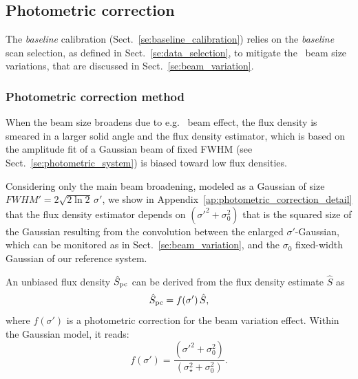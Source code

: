 \subsection{Photometric correction}
\label{se:photometric_correction}

The \emph{baseline} calibration (Sect.~\ref{se:baseline_calibration}) relies on
the \emph{baseline} scan selection, as defined in Sect.~\ref{se:data_selection},
to mitigate the \afternoon\ beam size variations, that are discussed in
Sect.~\ref{se:beam_variation}. 

\subsubsection{Photometric correction method}
\label{se:photometric_correction_method}

When the beam size broadens due to e.g. \afternoon\ beam effect, the
flux density is smeared in a larger solid angle and
the flux density estimator, which is based on the amplitude fit of a
Gaussian beam of fixed FWHM (see
Sect.~\ref{se:photometric_system}) is biased toward low flux
densities.

Considering only the main beam broadening, modeled as a Gaussian of
size $FWHM' = 2 \sqrt{2\ln{2}} \, \sigma '$, we show in
Appendix~\ref{ap:photometric_correction_detail} that
the flux density estimator depends on {\lp $(\sigma'^2 +\sigma_0^2)$
  that is the squared size of the Gaussian
  resulting from the convolution} between the enlarged
$\sigma '$-Gaussian, which can be monitored as in Sect.~\ref{se:beam_variation}, and the 
$\sigma_0$ fixed-width Gaussian of our reference system.

An unbiased
flux density $\hat{S}_{\rm{pc}}$ can be derived from the flux density
estimate $\hat{S}$ as
\begin{equation}
  \hat{S}_{\rm{pc}} = f(\sigma')\, \hat{S},
\end{equation}
where $f(\sigma')$ is a photometric correction for the beam variation
effect. Within the Gaussian model, it reads:
\begin{equation}
  f(\sigma') = \frac{(\sigma'^2 + \sigma_0^2)}{(\sigma_{\star}^2 + \sigma_0^2)}. 
\end{equation} 

